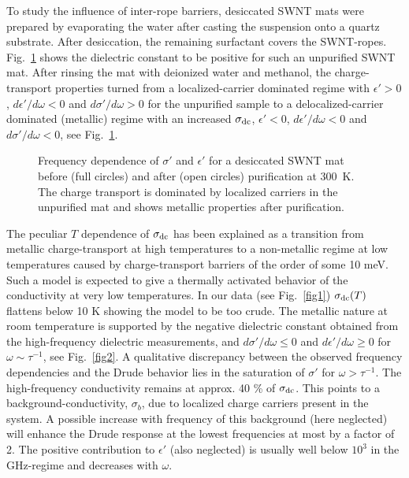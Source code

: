 \begin{multicols}{2}
To study the influence of inter-rope barriers, desiccated SWNT mats
were prepared by evaporating the water after casting the
suspension onto a quartz substrate. After desiccation, the remaining
surfactant covers the SWNT-ropes. Fig.~\ref{fig4} shows the
dielectric constant to be positive for such an unpurified SWNT mat.
After rinsing the mat with deionized water and methanol, the
charge-transport properties turned from a localized-carrier
dominated regime with $\epsilon' > 0$, $d\epsilon' / d\omega < 0$
and $d\sigma' / d\omega > 0$ for the unpurified sample to a
delocalized-carrier dominated (metallic) regime with an increased
$\sigma_{\rm dc}$, $\epsilon' < 0$, $d\epsilon' / d\omega < 0$ and
$d\sigma'/ d\omega < 0$, see Fig.~\ref{fig4}.
\begin{figure}[htb]
\begin{center}
\leavevmode
{}
\end{center}
\caption{Frequency dependence of $\sigma'$ and $\epsilon'$ for a desiccated
SWNT mat before (full circles) and after (open circles)
purification at 300~K. The charge transport is dominated by localized
carriers in the unpurified mat and shows metallic properties after
purification.}
\label{fig4}
\end{figure}

The peculiar $T$ dependence of $\sigma_{\rm dc}$ has been explained
as a transition from metallic charge-transport at high temperatures
to a non-metallic regime at low temperatures caused by
charge-transport barriers of the order of some 10 meV\cite{Kane97}. Such a
model is expected to give a thermally activated behavior of the conductivity
at very low temperatures.  In our data (see Fig.~\ref{fig1})
$\sigma_{\rm dc}(T)$ flattens below 10 K showing the model to be too crude.
The metallic nature at room temperature is supported by the
negative dielectric constant obtained from the high-frequency
dielectric measurements, and $d\sigma'/d\omega \le 0$ and
$d\epsilon'/d\omega \ge 0$ for $\omega \sim \tau^{-1}$, see Fig.~\ref{fig2}.
A qualitative discrepancy between the observed frequency dependencies and the
Drude behavior lies in the saturation of
$\sigma'$ for $\omega >\tau^{- 1}$. The high-frequency
conductivity remains at approx. 40 \% of $\sigma_{\rm dc}$. This
points to a background-conductivity, $\sigma_b$, due to localized
charge carriers present in the system. A possible increase with frequency
of this background\cite{Reedijk98} (here neglected) will enhance the Drude
response at the lowest frequencies at most by a factor of 2.  The positive
contribution to $\epsilon'$ (also neglected) is usually well below $10^3$ in
the GHz-regime and decreases with $\omega$.


\end{multicols}
